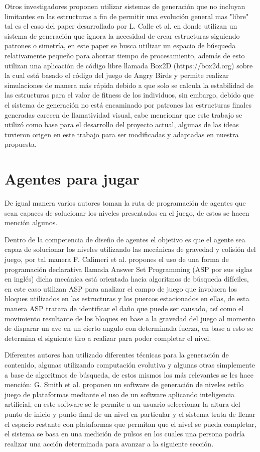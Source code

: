Otros investigadores proponen utilizar sistemas de generación que no incluyan
limitantes en las estructuras a fin de permitir una evolución general mas
"libre" tal es el caso del paper desarrollado por L. Calle et al.
\cite{Calle2019} en donde utilizan un sistema de generación que ignora la
necesidad de crear estructuras siguiendo patrones o simetría, en este paper se
busca utilizar un espacio de búsqueda relativamente pequeño para ahorrar tiempo
de procesamiento, además de esto utilizan una aplicación de código libre llamada
Box2D (https://box2d.org) sobre la cual está basado el código del juego de Angry
Birds y permite realizar simulaciones de manera más rápida debido a que solo se
calcula la estabilidad de las estructuras para el valor de fitness de los
individuos, sin embargo, debido que el sistema de generación no está encaminado
por patrones las estructuras finales generadas carecen de llamatividad visual,
cabe mencionar que este trabajo se utilizó como base para el desarrollo del
proyecto actual, algunas de las ideas tuvieron origen en este trabajo para ser
modificadas y adaptadas en nuestra propuesta.

\section{Agentes para jugar}
\label{section:others}

De igual manera varios autores toman la ruta de programación de agentes que sean
capaces de solucionar los niveles presentados en el juego, de estos se hacen
mención algunos.

Dentro de la competencia de diseño de agentes el objetivo es que el agente sea
capaz de solucionar los niveles utilizando las mecánicas de gravedad y colisión
del juego, por tal manera F. Calimeri et al. \cite{Calimeri2016} propones el uso
de una forma de programación declarativa llamada Answer Set Programming (ASP por
sus siglas en inglés) dicha mecánica está orientada hacia algoritmos de búsqueda
difíciles, en este caso utilizan ASP para analizar el campo de juego que
involucra los bloques utilizados en las estructuras y los puercos estacionados
en ellas, de esta manera ASP tratara de identificar el daño que puede ser
causado, así como el movimiento resultante de los bloques en base a la gravedad
del juego al momento de disparar un ave en un cierto angulo con determinada
fuerza, en base a esto se determina el siguiente tiro a realizar para poder
completar el nivel. 

Diferentes autores han utilizado diferentes técnicas para la generación de
contenido, algunas utilizando computación evolutiva y algunas otras simplemente
a base de algoritmos de búsqueda, de estos mismos los más relevantes se les hace 
mención: G. Smith et al.\cite{Smith2009} proponen un software de generación de
niveles estilo juego de plataformas mediante el uso de un software aplicando
inteligencia artificial, en este software se le permite a un usuario seleccionar
la altura del punto de inicio y punto final de un nivel en particular y el
sistema trata de llenar el espacio restante con plataformas que permitan que el
nivel se pueda completar, el sistema se basa en una medición de pulsos en los
cuales una persona podría realizar una acción determinada para avanzar a la
siguiente sección.
